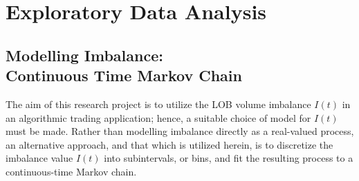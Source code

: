 \chapter{Exploratory Data Analysis}

\section[Modelling Imbalance: Continuous Time Markov Chain]{Modelling Imbalance: \texorpdfstring{\\}{} Continuous Time Markov Chain}
The aim of this research project is to utilize the LOB volume imbalance $I(t)$ in an algorithmic trading application; hence, a suitable choice of model for $I(t)$ must be made. Rather than modelling imbalance directly as a real-valued process, an alternative approach, and that which is utilized herein, is to discretize the imbalance value $I(t)$ into subintervals, or bins, and fit the resulting process to a continuous-time Markov chain.

